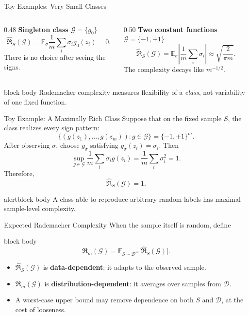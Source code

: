 \documentclass[aspectratio=169,10pt]{beamer}
\newcommand{\D}{\mathcal{D}}
\newcommand{\Gc}{\mathcal{G}}
\newcommand{\Rad}{\mathfrak{R}}
\newcommand{\RadS}{\widehat{\mathfrak{R}}_S}
\newcommand{\pmone}{\{-1,+1\}}
\newcommand{\E}{\mathbb{E}}
\newcommand{\abs}[1]{\left\lvert #1\right\rvert}
\newcommand{\KeyBox}[1]{%
  \begin{beamercolorbox}[rounded=true,sep=0.22cm,wd=\linewidth]{block body}
    #1
  \end{beamercolorbox}%
}
\newcommand{\OrangeBox}[1]{%
  \begin{beamercolorbox}[rounded=true,sep=0.22cm,wd=\linewidth]{alertblock body}
    #1
  \end{beamercolorbox}%
}
\begin{document}
\begin{frame}[t]{Toy Examples: Very Small Classes}
  \vspace{0.06cm}
  \begin{columns}[T,totalwidth=\textwidth]
    \begin{column}{0.48\textwidth}
      \textbf{Singleton class $\Gc=\{g_0\}$}
      \[
        \RadS(\Gc)
        =\E_\sigma\frac{1}{m}\sum_i\sigma_i g_0(z_i)=0.
      \]
      There is no choice after seeing the signs.
    \end{column}
    \begin{column}{0.50\textwidth}
      \textbf{Two constant functions $\Gc=\{-1,+1\}$}
      \[
        \RadS(\Gc)
        =\E_\sigma\abs{\frac{1}{m}\sum_i\sigma_i}
        \approx \sqrt{\frac{2}{\pi m}}.
      \]
      The complexity decays like $m^{-1/2}$.
    \end{column}
  \end{columns}
  \vspace{0.20cm}
  \KeyBox{Rademacher complexity measures flexibility of a \emph{class}, not variability of one fixed function.}
\end{frame}

\begin{frame}[t]{Toy Example: A Maximally Rich Class}
  \vspace{0.06cm}
  Suppose that on the fixed sample $S$, the class realizes every sign pattern:
  \[
    \{(g(z_1),\ldots,g(z_m)):g\in\Gc\}=\pmone^m.
  \]
  After observing $\sigma$, choose $g_\sigma$ satisfying $g_\sigma(z_i)=\sigma_i$. Then
  \[
    \sup_{g\in\Gc}\frac{1}{m}\sum_i\sigma_i g(z_i)
    =\frac{1}{m}\sum_i\sigma_i^2=1.
  \]
  Therefore,
  \[
    \boxed{\RadS(\Gc)=1.}
  \]
  \vspace{0.08cm}
  \OrangeBox{A class able to reproduce arbitrary random labels has maximal sample-level complexity.}
\end{frame}


\begin{frame}[t]{Expected Rademacher Complexity}
	\vspace{0.10cm}
	When the sample itself is random, define
	\begin{beamercolorbox}[rounded=true,sep=0.22cm,wd=\linewidth]{block body}
		\[
		\boxed{
			\Rad_m(\Gc)=\E_{S\sim\D^m}\bigl[\RadS(\Gc)\bigr].}
		\]
	\end{beamercolorbox}
	\vspace{0.18cm}
	\begin{itemize}
		\setlength{\itemsep}{0.15cm}
		\item $\RadS(\Gc)$ is \textbf{data-dependent}: it adapts to the observed sample.
		\item $\Rad_m(\Gc)$ is \textbf{distribution-dependent}: it averages over samples from $\D$.
		\item A worst-case upper bound may remove dependence on both $S$ and $\D$, at the cost of looseness.
	\end{itemize}
\end{frame}
\end{document}
